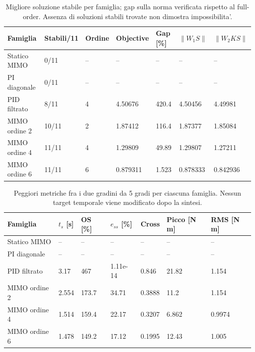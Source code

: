 \begin{table}[htbp]\centering\small
\begin{tabular}{lllllll}\toprule
Famiglia & Stabili/11 & Ordine & Objective & Gap [\%] & $\|W_1S\|$ & $\|W_2KS\|$\\\midrule
Statico MIMO & 0/11 & -- & -- & -- & -- & --\\
PI diagonale & 0/11 & -- & -- & -- & -- & --\\
PID filtrato & 8/11 & 4 & 4.50676 & 420.4 & 4.50456 & 4.49981\\
MIMO ordine 2 & 10/11 & 2 & 1.87412 & 116.4 & 1.87377 & 1.85084\\
MIMO ordine 4 & 11/11 & 4 & 1.29809 & 49.89 & 1.29807 & 1.27211\\
MIMO ordine 6 & 11/11 & 6 & 0.879311 & 1.523 & 0.878333 & 0.842936\\
\bottomrule\end{tabular}
\caption{Migliore soluzione stabile per famiglia; gap sulla norma verificata rispetto al full-order. Assenza di soluzioni stabili trovate non dimostra impossibilita'.}\end{table}
\begin{table}[htbp]\centering\small
\begin{tabular}{lllllll}\toprule
Famiglia & $t_s$ [s] & OS [\%] & $e_{ss}$ [\%] & Cross & Picco [N m] & RMS [N m]\\\midrule
Statico MIMO & -- & -- & -- & -- & -- & --\\
PI diagonale & -- & -- & -- & -- & -- & --\\
PID filtrato & 3.17 & 467 & 1.11e-14 & 0.846 & 21.82 & 1.154\\
MIMO ordine 2 & 2.554 & 173.7 & 34.71 & 0.3888 & 11.2 & 1.154\\
MIMO ordine 4 & 1.514 & 159.4 & 22.17 & 0.3207 & 6.862 & 0.9974\\
MIMO ordine 6 & 1.478 & 149.2 & 17.12 & 0.1995 & 12.43 & 1.005\\
\bottomrule\end{tabular}
\caption{Peggiori metriche fra i due gradini da 5 gradi per ciascuna famiglia. Nessun target temporale viene modificato dopo la sintesi.}\end{table}
